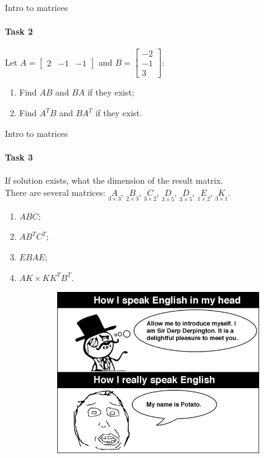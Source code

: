 \documentclass[aspectratio=169,notes]{beamer}
\begin{document}
\begin{frame}[t]{Intro to matrices}
\framesubtitle{Task 2}
Let $A=\begin{bmatrix} 2 & -1 & -1\end{bmatrix}$ and $B=\begin{bmatrix} -2 \\ -1 \\ 3 \end{bmatrix}$:
\begin{enumerate}
    \item Find $AB$ and $BA$ if they exist;
    \item Find $A^TB$ and $BA^T$ if they exist.
\end{enumerate}   
\end{frame}

\begin{frame}[t]{Intro to matrices}
\framesubtitle{Task 3}
If solution exists, what the dimension of the result matrix. \\ There are several matrices: $\underset{3\times3}{A}$, $\underset{2\times3}{B}$, $\underset{3\times2}{C}$, $\underset{3\times5}{D}$, $\underset{3\times5}{D}$, $\underset{1\times2}{E}$, $\underset{3\times1}{K}$.
\begin{enumerate}
    \item $ABC$;
    \item $AB^TC^T$;
    \item $EBAE$;
    \item $AK \times K K^T B^T$.
\end{enumerate}
\end{frame}

\begin{frame}[t]{}
    \begin{figure}[H]
        \centering\includegraphics[height=7cm,width=1\textwidth,keepaspectratio]{english_meme.png}
        \label{fig:english_meme.png}
    \end{figure}
\end{frame}
\end{document}
